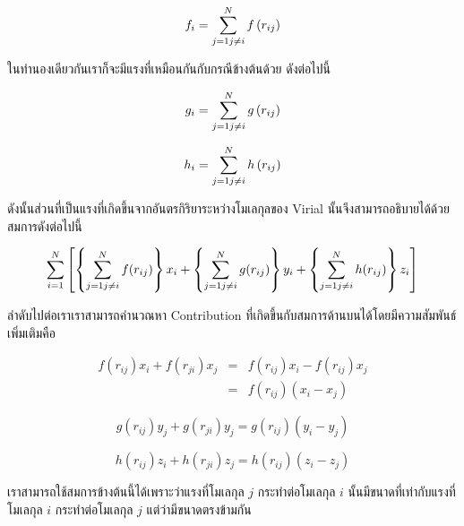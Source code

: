 \begin{equation}
    f_i=\sum_{j=1 \\ j\neq i}^{N} f\left( r_{ij}\right) 
\end{equation}

\noindent ในทำนองเดียวกันเราก็จะมีแรงที่เหมือนกันกับกรณีข้างต้นด้วย ดังต่อไปนี้

\begin{equation}
    g_i=\sum_{j=1 \\ j\neq i}^{N} g\left( r_{ij}\right) 
\end{equation}

\begin{equation}
    h_i=\sum_{j=1 \\ j\neq i}^{N} h\left( r_{ij}\right) 
\end{equation}

ดังนั้นส่วนที่เป็นแรงที่เกิดขึ้นจากอันตรกิริยาระหว่างโมเลกุลของ Virial นั้นจึงสามารถอธิบายได้ด้วยสมการดังต่อไปนี้

\begin{equation}
    \sum_{i=1}^{N} \left[ \left\{ \sum_{j=1 \\ j\neq i}^{N} f(r_{ij})\right\}
    x_i+\left\{ \sum_{j=1 \\ j\neq i}^{N} g(r_{ij})\right\} y_i+\left\{
    \sum_{j=1 \\ j\neq i}^{N} h(r_{ij})\right\} z_i\right] 
\end{equation}

ลำดับไปต่อเราเราสามารถคำนวณหา Contribution ที่เกิดขึ้นกับสมการด้านบนได้โดยมีความสัมพันธ์เพิ่มเติมคือ

\begin{eqnarray}
    f\left( r_{ij}\right) x_i+f\left( r_{ji}\right) x_j &=&f\left( r_{ij}\right)
    x_i-f\left( r_{ij}\right) x_j \\
    &=&f\left( r_{ij}\right) \left( x_i-x_j\right) 
\end{eqnarray}

\begin{equation}
    g\left( r_{ij}\right) y_j+g\left( r_{ji}\right) y_j=g\left( r_{ij}\right)
    \left( y_i-y_j\right) 
\end{equation}

\begin{equation}
    h\left( r_{ij}\right) z_i+h\left( r_{ji}\right) z_j=h\left( r_{ij}\right)
    \left( z_i-z_j\right) 
\end{equation}

เราสามารถใช้สมการข้างต้นนี้ได้เพราะว่าแรงที่โมเลกุล $j$ กระทำต่อโมเลกุล $i$ นั้นมีขนาดที่เท่ากับแรงที่โมเลกุล $i$ กระทำต่อโมเลกุล $j$ 
แต่ว่ามีขนาดตรงข้ามกัน


